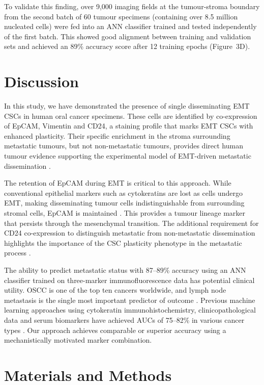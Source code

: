 \documentclass[11pt]{article}
\begin{document}
To validate this finding, over 9,000 imaging fields at the tumour-stroma boundary from the second batch of 60 tumour specimens (containing over 8.5 million nucleated cells) were fed into an ANN classifier trained and tested independently of the first batch. This showed good alignment between training and validation sets and achieved an 89\% accuracy score after 12 training epochs (Figure~3D).

\section{Discussion}

In this study, we have demonstrated the presence of single disseminating EMT CSCs in human oral cancer specimens. These cells are identified by co-expression of EpCAM, Vimentin and CD24, a staining profile that marks EMT CSCs with enhanced plasticity. Their specific enrichment in the stroma surrounding metastatic tumours, but not non-metastatic tumours, provides direct human tumour evidence supporting the experimental model of EMT-driven metastatic dissemination \citep{biddle2011,tsai2012,ocana2012}.

The retention of EpCAM during EMT is critical to this approach. While conventional epithelial markers such as cytokeratins are lost as cells undergo EMT, making disseminating tumour cells indistinguishable from surrounding stromal cells, EpCAM is maintained \citep{biddle2016,keller2019}. This provides a tumour lineage marker that persists through the mesenchymal transition. The additional requirement for CD24 co-expression to distinguish metastatic from non-metastatic dissemination highlights the importance of the CSC plasticity phenotype in the metastatic process \citep{biddle2011,liu2014,lawson2015}.

The ability to predict metastatic status with 87--89\% accuracy using an ANN classifier trained on three-marker immunofluorescence data has potential clinical utility. OSCC is one of the top ten cancers worldwide, and lymph node metastasis is the single most important predictor of outcome \citep{sano2007}. Previous machine learning approaches using cytokeratin immunohistochemistry, clinicopathological data and serum biomarkers have achieved AUCs of 75--82\% in various cancer types \citep{tseng2019,bur2019,takamatsu2019}. Our approach achieves comparable or superior accuracy using a mechanistically motivated marker combination.

\section{Materials and Methods}
\end{document}
